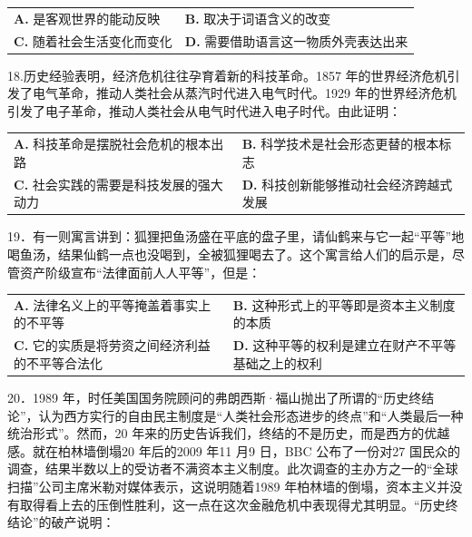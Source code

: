 \documentclass[UTF8,11pt]{ctexart}
\begin{document}
\begin{center}\begin{tabular}{>{\raggedright\arraybackslash}p{\dimexpr(\linewidth-4\tabcolsep)/2\relax}>{\raggedright\arraybackslash}p{\dimexpr(\linewidth-4\tabcolsep)/2\relax}}
\textbf{A.} 是客观世界的能动反映 & \textbf{B.} 取决于词语含义的改变\\[.35em]
\textbf{C.} 随着社会生活变化而变化 & \textbf{D.} 需要借助语言这一物质外壳表达出来\\[.35em]\end{tabular}\end{center}

18.历史经验表明，经济危机往往孕育着新的科技革命。1857 年的世界经济危机引发了电气革命，推动人类社会从蒸汽时代进入电气时代。1929 年的世界经济危机引发了电子革命，推动人类社会从电气时代进入电子时代。由此证明：


\begin{center}\begin{tabular}{>{\raggedright\arraybackslash}p{\dimexpr(\linewidth-4\tabcolsep)/2\relax}>{\raggedright\arraybackslash}p{\dimexpr(\linewidth-4\tabcolsep)/2\relax}}
\textbf{A.} 科技革命是摆脱社会危机的根本出路 & \textbf{B.} 科学技术是社会形态更替的根本标志\\[.35em]
\textbf{C.} 社会实践的需要是科技发展的强大动力 & \textbf{D.} 科技创新能够推动社会经济跨越式发展\\[.35em]\end{tabular}\end{center}

19．有一则寓言讲到：狐狸把鱼汤盛在平底的盘子里，请仙鹤来与它一起“平等”地喝鱼汤，结果仙鹤一点也没喝到，全被狐狸喝去了。这个寓言给人们的启示是，尽管资产阶级宣布“法律面前人人平等”，但是：


\begin{center}\begin{tabular}{>{\raggedright\arraybackslash}p{\dimexpr(\linewidth-4\tabcolsep)/2\relax}>{\raggedright\arraybackslash}p{\dimexpr(\linewidth-4\tabcolsep)/2\relax}}
\textbf{A.} 法律名义上的平等掩盖着事实上的不平等 & \textbf{B.} 这种形式上的平等即是资本主义制度的本质\\[.35em]
\textbf{C.} 它的实质是将劳资之间经济利益的不平等合法化 & \textbf{D.} 这种平等的权利是建立在财产不平等基础之上的权利\\[.35em]\end{tabular}\end{center}

20．1989 年，时任美国国务院顾问的弗朗西斯·福山抛出了所谓的“历史终结论”，认为西方实行的自由民主制度是“人类社会形态进步的终点”和“人类最后一种统治形式”。然而，20 年来的历史告诉我们，终结的不是历史，而是西方的优越感。就在柏林墙倒塌20 年后的2009 年11 月9 日，BBC 公布了一份对27 国民众的调查，结果半数以上的受访者不满资本主义制度。此次调查的主办方之一的“全球扫描”公司主席米勒对媒体表示，这说明随着1989 年柏林墙的倒塌，资本主义并没有取得看上去的压倒性胜利，这一点在这次金融危机中表现得尤其明显。“历史终结论”的破产说明：
\end{document}

